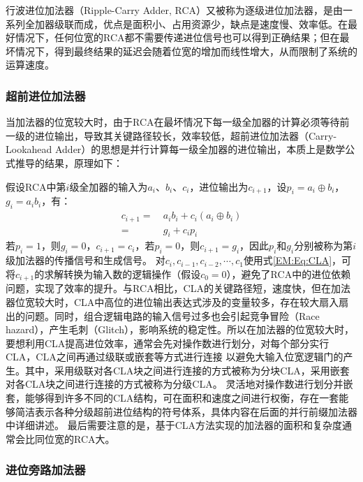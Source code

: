行波进位加法器（Ripple-Carry Adder, RCA）又被称为逐级进位加法器，是由一系列全加器级联而成，优点是面积小、占用资源少，缺点是速度慢、效率低。在最好情况下，任何位宽的RCA都不需要传递进位信号也可以得到正确结果；但在最坏情况下，得到最终结果的延迟会随着位宽的增加而线性增大，从而限制了系统的运算速度。

\subsubsection{超前进位加法器}

当加法器的位宽较大时，由于RCA在最坏情况下每一级全加器的计算必须等待前一级的进位输出，导致其关键路径较长，效率较低，超前进位加法器（Carry-Lookahead Adder）的思想是并行计算每一级全加器的进位输出，本质上是数学公式推导的结果，原理如下：

假设RCA中第$i$级全加器的输入为$a_i$、$b_i$、$c_{i}$，进位输出为$c_{i+1}$，设$p_i = a_i \oplus b_i$，$g_i = a_i b_i$，有：
\begin{equation}
\begin{aligned}
    c_{i+1} = & \ a_i b_i + c_i(a_i \oplus b_i) \\
    = & \ g_i + c_i p_i
\end{aligned}
\label{EM:Eq:CLA}
\end{equation}
若$p_i=1$，则$g_i =0$，$c_{i+1}=c_i$，若$p_i=0$，则$c_{i+1}=g_i$，因此$p_i$和$g_i$分别被称为第$i$级加法器的传播信号和生成信号。
对$c_{i}, c_{i-1},c_{i-2},\cdots,c_{1}$使用式\eqref{EM:Eq:CLA}，可将$c_{i+1}$的求解转换为输入数的逻辑操作（假设$c_0=0$），避免了RCA中的进位依赖问题，实现了效率的提升。与RCA相比，CLA的关键路径短，速度快，但在加法器位宽较大时，CLA中高位的进位输出表达式涉及的变量较多，存在较大扇入扇出的问题。同时，组合逻辑电路的输入信号过多也会引起竞争冒险（Race hazard），产生毛刺（Glitch），影响系统的稳定性。所以在加法器的位宽较大时，要想利用CLA提高进位效率，通常会先对操作数进行划分，对每个部分实行CLA，CLA之间再通过级联或嵌套等方式进行连接%
以避免大输入位宽逻辑门的产生。其中，采用级联对各CLA块之间进行连接的方式被称为分块CLA，采用嵌套对各CLA块之间进行连接的方式被称为分级CLA。
灵活地对操作数进行划分并嵌套，能够得到许多不同的CLA结构，可在面积和速度之间进行权衡，存在一套能够简洁表示各种分级超前进位结构的符号体系，具体内容在后面的并行前缀加法器中详细讲述。
最后需要注意的是，基于CLA方法实现的加法器的面积和复杂度通常会比同位宽的RCA大。

\subsubsection{进位旁路加法器}

